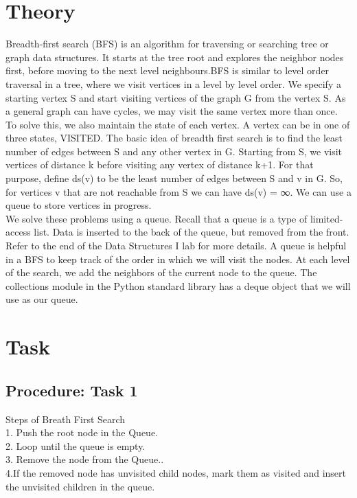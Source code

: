 \documentclass[11pt]{article}            %
\begin{document}
\section{Theory }              
Breadth-first search (BFS) is an algorithm for traversing or searching tree or graph data structures. It starts at the tree root  and explores the neighbor nodes first, before moving to the next level neighbours.BFS is similar to level order traversal in a tree, where we visit vertices in a level by level order. We specify a starting vertex S and start visiting vertices of the graph G from the vertex S. As a general graph can have cycles, we may visit the same vertex more than once. To solve this, we also maintain the state of each vertex. A vertex can be in one of three states, VISITED. The basic idea of breadth first search is to find the least number of edges between S and any other vertex in G. Starting from S, we visit vertices of distance k before visiting any vertex of distance k+1. For that purpose, define ds(v) to be the least number of edges between S and v in G. So, for vertices v that are not reachable from S we can have ds(v) = ∞. We can use a queue to store vertices in progress. \\
We solve these problems using a queue. Recall that a queue is a type of limited-access list. Data
is inserted to the back of the queue, but removed from the front. Refer to the end of the Data
Structures I lab for more details.
A queue is helpful in a BFS to keep track of the order in which we will visit the nodes. At
each level of the search, we add the neighbors of the current node to the queue. The collections
module in the Python standard library has a deque object that we will use as our queue.\\



\section{Task}  
\subsection{Procedure: Task 1 }
Steps of Breath First Search\\
1.	Push the root node in the Queue.\\
2.	Loop until the queue is empty.\\
3.	Remove the node from the Queue..\\
4.If the removed node has unvisited child nodes, mark them as visited and insert the unvisited children in the queue. \\     
\end{document}
